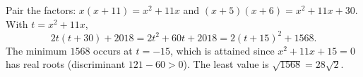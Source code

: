 Pair the factors: $x(x+11)=x^2+11x$ and $(x+5)(x+6)=x^2+11x+30$. With $t=x^2+11x$,
\[2t(t+30)+2018=2t^2+60t+2018=2(t+15)^2+1568.\]
The minimum $1568$ occurs at $t=-15$, which is attained since $x^2+11x+15=0$ has real roots (discriminant $121-60>0$). The least value is $\sqrt{1568}=\boxed{28\sqrt2}$.
